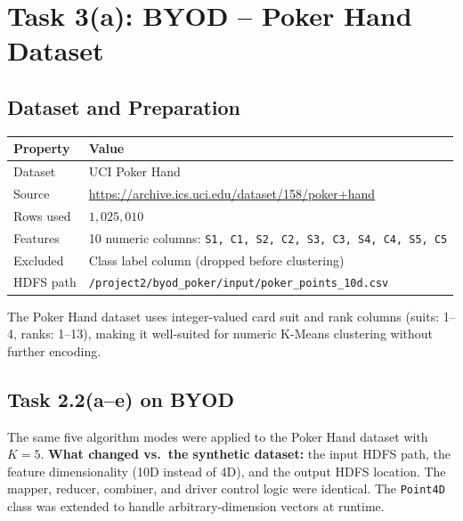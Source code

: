 \documentclass[11pt]{article}
\begin{document}
\section{Task 3(a): BYOD -- Poker Hand Dataset}

\subsection{Dataset and Preparation}

\begin{center}
\begin{tabular}{@{}ll@{}}
  \rowcolor{tableheader}
  \color{white}\textbf{Property} & \color{white}\textbf{Value} \\
  \midrule
  Dataset   & UCI Poker Hand \\
  \rowcolor{tablealt}
  Source    & \url{https://archive.ics.uci.edu/dataset/158/poker+hand} \\
  Rows used & $1{,}025{,}010$ \\
  \rowcolor{tablealt}
  Features  & 10 numeric columns: \texttt{S1, C1, S2, C2, S3, C3, S4, C4, S5, C5} \\
  Excluded  & Class label column (dropped before clustering) \\
  \rowcolor{tablealt}
  HDFS path & \texttt{/project2/byod\_poker/input/poker\_points\_10d.csv} \\
\end{tabular}
\end{center}

The Poker Hand dataset uses integer-valued card suit and rank columns (suits: 1--4, ranks: 1--13), making it well-suited for numeric K-Means clustering without further encoding.

\subsection{Task 2.2(a--e) on BYOD}

The same five algorithm modes were applied to the Poker Hand dataset with $K=5$. \textbf{What changed vs.\ the synthetic dataset:} the input HDFS path, the feature dimensionality (10D instead of 4D), and the output HDFS location. The mapper, reducer, combiner, and driver control logic were identical. The \texttt{Point4D} class was extended to handle arbitrary-dimension vectors at runtime.
\end{document}
